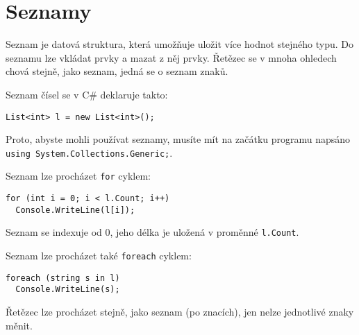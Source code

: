 \documentclass[12pt,a4paper]{article}
\begin{document}





\newpage

\section*{Seznamy}

Seznam je datová struktura, která umožňuje uložit více hodnot stejného typu.
Do seznamu lze vkládat prvky a mazat z něj prvky. Řetězec se v mnoha ohledech
chová stejně, jako seznam, jedná se o seznam znaků.

Seznam čísel se v C\# deklaruje takto:

\begin{verbatim}
List<int> l = new List<int>();
\end{verbatim}

Proto, abyste mohli používat seznamy, musíte mít na začátku programu napsáno\\
\texttt{using System.Collections.Generic;}.

Seznam lze procházet \texttt{for} cyklem:

\begin{verbatim}
for (int i = 0; i < l.Count; i++)
  Console.WriteLine(l[i]);
\end{verbatim}

Seznam se indexuje od 0, jeho délka je uložená v proměnné \texttt{l.Count}.

Seznam lze procházet také \texttt{foreach} cyklem:

\begin{verbatim}
foreach (string s in l)
  Console.WriteLine(s);
\end{verbatim}

Řetězec lze procházet stejně, jako seznam (po znacích), jen nelze jednotlivé
znaky měnit.
\end{document}
